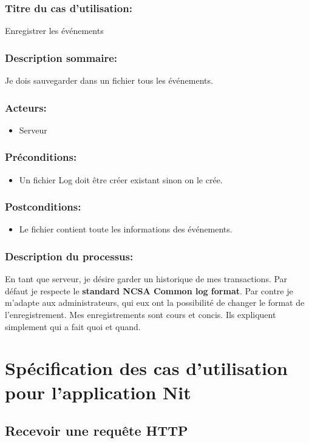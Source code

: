 \documentclass{scrreprt}
\begin{document}
\subsubsection{Titre du cas d'utilisation:} Enregistrer les événements
\subsubsection{Description sommaire:}Je dois sauvegarder dans un fichier tous les événements.
\subsubsection{Acteurs:}
\begin{itemize}
    \item Serveur
\end{itemize}
\subsubsection{Préconditions:}
\begin{itemize}
    \item  Un fichier Log doit être créer existant sinon on le crée.
\end{itemize} 
\subsubsection{Postconditions:}
\begin{itemize}
    \item  Le fichier contient toute les informations des événements.
\end{itemize} 
\subsubsection{Description du processus:}En tant que serveur, je désire garder un historique de mes transactions. Par
défaut je respecte le \textbf{standard NCSA Common log format}\cite{NCSA}. Par contre je m'adapte
aux administrateurs, qui eux ont la possibilité de changer le format de
l'enregistrement. Mes enregistrements sont cours et concis. Ils expliquent
simplement qui a fait quoi et quand.

\section{Spécification des cas d'utilisation pour l'application Nit}

\subsection{Recevoir une requête HTTP}
\end{document}
